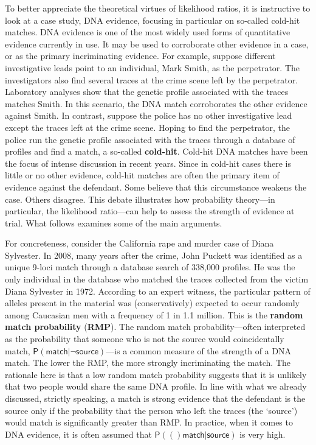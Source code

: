 \documentclass[10pt,dvipsnames,enabledeprecatedfontcommands]{scrartcl}
\newcommand{\pr}[1]{\mathsf{P}(#1)}
\begin{document}
To better appreciate the theoretical virtues of likelihood ratios, it is
instructive to look at a case study, DNA evidence, focusing in
particular on so-called cold-hit matches. DNA evidence is one of the
most widely used forms of quantitative evidence currently in use. It may
be used to corroborate other evidence in a case, or as the primary
incriminating evidence. For example, suppose different investigative
leads point to an individual, Mark Smith, as the perpetrator. The
investigators also find several traces at the crime scene left by the
perpetrator. Laboratory analyses show that the genetic profile
associated with the traces matches Smith. In this scenario, the DNA
match corroborates the other evidence against Smith. In contrast,
suppose the police has no other investigative lead except the traces
left at the crime scene. Hoping to find the perpetrator, the police run
the genetic profile associated with the traces through a database of
profiles and find a match, a so-called \textbf{cold-hit}. Cold-hit DNA
matches have been the focus of intense discussion in recent years. Since
in cold-hit cases there is little or no other evidence, cold-hit matches
are often the primary item of evidence against the defendant. Some
believe that this circumstance weakens the case. Others disagree. This
debate illustrates how probability theory---in particular, the
likelihood ratio---can help to assess the strength of evidence at trial.
What follows examines some of the main arguments.

For concreteness, consider the California rape and murder case of Diana
Sylvester. In 2008, many years after the crime, John Puckett was
identified as a unique 9-loci match through a database search of 338,000
profiles. He was the only individual in the database who matched the
traces collected from the victim Diana Sylvester in 1972. According to
an expert witness, the particular pattern of alleles present in the
material was (conservatively) expected to occur randomly among Caucasian
men with a frequency of 1 in 1.1 million. This is the
\textbf{random match probability} (\textbf{RMP}). The random match
probability---often interpreted as the probability that someone who is
not the source would coincidentally match,
\(\pr{\textsf{match} \vert \neg \textsf{source}}\)---is a common measure
of the strength of a DNA match. The lower the RMP, the more strongly
incriminating the match. The rationale here is that a low random match
probability suggests that it is unlikely that two people would share the
same DNA profile. In line with what we already discussed, strictly
speaking, a match is strong evidence that the defendant is the source
only if the probability that the person who left the traces (the
`source') would match is significantly greater than RMP. In practice,
when it comes to DNA evidence, it is often assumed that
\(\pr(\textsf{match} \vert \textsf{source})\) is very high.
\end{document}
